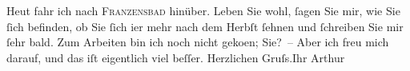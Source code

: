 \begin{ledgroupsized}[t]{13cm}
           \pstart
           Heut fahr ich nach \textsc{Franzensbad} hinüber.\pend
           \pstart
           Leben Sie wohl, ſagen Sie mir, wie Sie ſich befinden, ob Sie ſich i{\geminationm}er mehr nach dem Herbſt ſehnen und ſchreiben Sie
                    mir ſehr bald. Zum Arbeiten bin ich noch {\pb}nicht
                        geko{\geminationm}en; Sie? – Aber ich freu mich darauf, und
                    das iſt eigentlich viel beſſer.\pend
           \pstart Herzlichen Gruſs.\hspace*{2em}Ihr
                        \spacefill\mbox{Arthur}\pend{}          \endnumbering{}\end{ledgroupsized}  \newcommand{\dateiname}{L00462}\newcommand{\titel}{Arthur Schnitzler an Hugo von Hofmannsthal, 10. 7. 1895}\newcommand{\editorInnen}{Martin Anton Müller und Gerd-Hermann Susen}
            \footnotesize
\begin{ledgroupsized}[t]{11.5cm}
\end{ledgroupsized}
         
      